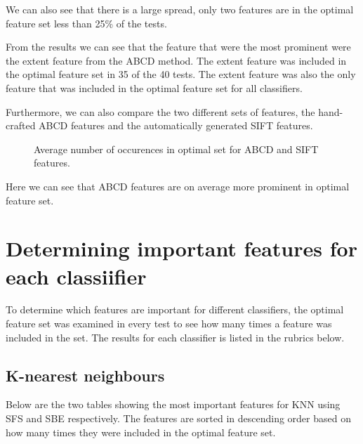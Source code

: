\documentclass{kththesis}
\begin{document}
We can also see that there is a large spread, only two features are in the optimal feature set less than 25\% of the tests.

From the results we can see that the feature that were the most prominent were the extent feature from the ABCD method. The extent feature was included in the optimal feature set in 35 of the 40 tests. The extent feature was also the only feature that was included in the optimal feature set for all classifiers.

Furthermore, we can also compare the two different sets of features, the hand-crafted ABCD features and the automatically generated SIFT features.

\begin{figure}[h!]
  \caption{Average number of occurences in optimal set for ABCD and SIFT features.}
\end{figure}

Here we can see that ABCD features are on average more prominent in optimal feature set. 


\section{Determining important features for each classiifier}

To determine which features are important for different classifiers, the optimal feature set was examined in every test to see how many times a feature was included in the set. The results for each classifier is listed in the rubrics below.

\subsection{K-nearest neighbours}

Below are the two tables showing the most important features for KNN using SFS and SBE respectively. The features are sorted in descending order based on how many times they were included in the optimal feature set. 
\end{document}
